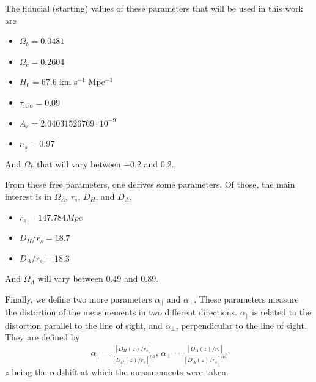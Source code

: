 The fiducial (starting) values of these parameters that will be used in this work are
\begin{itemize}
	\item 	$\Omega_b =  0.0481 $
	\item 	$\Omega_c =  0.2604$ 
	\item $H_0 = 67.6$ km s$ ^{-1}$ Mpc$^{-1}$
	\item $\tau_{\text{reio}} = 0.09$
	\item $A_s = 2.04031526769\cdot 10^{-9}$
	\item $n_s = 0.97$
\end{itemize}
And $\Omega _k$ that will vary between $-0.2$ and 0.2.

From these free parameters, one derives some parameters. Of those, the main interest is in $\Omega_\Lambda$, $r_s$, $D_H$, and $D_A$, 
\begin{itemize}
	\item $r_s = 147.784 Mpc$
	\item $D_H/r_s  = 18.7$
	\item $D_A/r_s  = 18.3$
\end{itemize}
And $\Omega_\Lambda$ will vary between $0.49$ and $0.89$.

Finally, we define two more parameters $\alpha_\parallel$ and $\alpha_\perp$. These parameters measure the distortion of the measurements in two different directions. $\alpha_\parallel$ is related to the distortion parallel to the line of sight, and  $\alpha_\perp$, perpendicular to the line of sight. They are defined by 
\begin{align}
	\alpha_\parallel = \frac{\left[ D_H(z) /r_s \right] }{\left[ D_H(z)/r_s \right]^{\text{fid}} }, \, \alpha_\perp = \frac{\left[ D_A(z) /r_s \right] }{\left[ D_A(z)/r_s \right]^{\text{fid}} }
	\label{eq:alphas-def}
\end{align}
$z$ being the redshift at which the measurements were taken.
